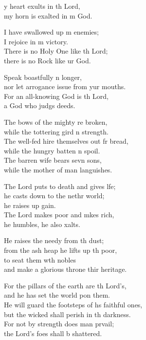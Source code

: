 \begin{psalmverse}
  \begin{patverse}
    y heart exults in th Lord,\Med\\
my horn is exalted in m God.

I have swallowed up m enemies;\Med\\
I rejoice in m victory.\\
There is no Holy One like th Lord;\Med\\
there is no Rock like ur God.

Speak boastfully n longer,\Med\\
nor let arrogance issue from yur mouths.\\
For an all-knowing God is th Lord,\Med\\
a God who judgs deeds.

The bows of the mighty re broken,\Med\\
while the tottering gird n strength.\\
The well-fed hire themselves out fr bread,\Med\\
while the hungry batten n spoil.\\
The barren wife bears sevn sons,\Med\\
while the mother of man languishes.

The Lord puts to death and gives l\pointup{\i}fe;\Flex\\
he casts down to the nethr world;\Med\\
he raises up gain.\\
The Lord makes poor and mkes rich,\Med\\
he humbles, he also xalts.

He raises the needy from th dust;\Med\\
from the ash heap he lifts up th poor,\\
to seat them w\pointup{\i}th nobles\Med\\
and make a glorious throne thir heritage.

For the pillars of the earth are th Lord’s,\Med\\
and he has set the world pon them.\\
He will guard the footsteps of h\pointup{\i}s faithful ones,\Med\\
but the wicked shall perish in th darkness.\\
For not by strength does man prvail;\Med\\
the Lord’s foes shall b shattered.


\end{patverse}
\end{psalmverse}
